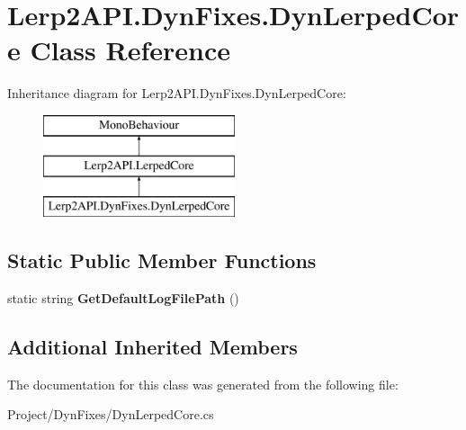\hypertarget{class_lerp2_a_p_i_1_1_dyn_fixes_1_1_dyn_lerped_core}{}\section{Lerp2\+A\+P\+I.\+Dyn\+Fixes.\+Dyn\+Lerped\+Core Class Reference}
\label{class_lerp2_a_p_i_1_1_dyn_fixes_1_1_dyn_lerped_core}
Inheritance diagram for Lerp2\+A\+P\+I.\+Dyn\+Fixes.\+Dyn\+Lerped\+Core\+:\begin{figure}[H]
\begin{center}
\leavevmode
\includegraphics[height=3.000000cm]{class_lerp2_a_p_i_1_1_dyn_fixes_1_1_dyn_lerped_core}
\end{center}
\end{figure}
\subsection*{Static Public Member Functions}
\begin{DoxyCompactItemize}
\item 
\mbox{\label{class_lerp2_a_p_i_1_1_dyn_fixes_1_1_dyn_lerped_core_a659d155cc5e2f73d09e028991d6d8957}} 
static string {\bfseries Get\+Default\+Log\+File\+Path} ()
\end{DoxyCompactItemize}
\subsection*{Additional Inherited Members}


The documentation for this class was generated from the following file\+:\begin{DoxyCompactItemize}
\item 
Project/\+Dyn\+Fixes/Dyn\+Lerped\+Core.\+cs\end{DoxyCompactItemize}
